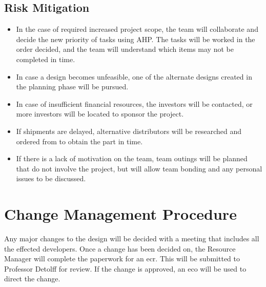 \subsection{Risk Mitigation}
\begin{itemize}
	\item In the case of required increased project scope, the team will collaborate and decide the new priority of tasks using AHP. 
The tasks will be worked in the order decided, and the team will understand which items may not be completed in time.
	\item In case a design becomes unfeasible, one of the alternate designs created in the planning phase will be pursued.
	\item In case of insufficient financial resources, the investors will be contacted, or more investors will be located to sponsor the project.
	\item If shipments are delayed, alternative distributors will be researched and ordered from to obtain the part in time.
	\item If there is a lack of motivation on the team, team outings will be planned that do not involve the project, but will allow team bonding and any personal issues to be discussed.
\end{itemize}

\section{Change Management Procedure}
Any major changes to the design will be decided with a meeting that includes all the effected developers.
Once a change has been decided on, the Resource Manager will complete the paperwork for an \gls{ecr}.
This will be submitted to Professor Detolff for review.
If the change is approved, an \gls{eco} will be used to direct the change.

